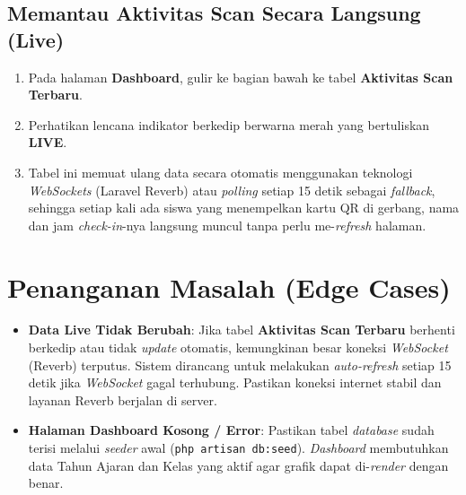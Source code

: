 \subsection{Memantau Aktivitas Scan Secara Langsung (Live)}
\begin{enumerate}
    \item Pada halaman \textbf{Dashboard}, gulir ke bagian bawah ke tabel \textbf{Aktivitas Scan Terbaru}.
    \item Perhatikan lencana indikator berkedip berwarna merah yang bertuliskan \textbf{LIVE}.
    \item Tabel ini memuat ulang data secara otomatis menggunakan teknologi \textit{WebSockets} (Laravel Reverb) atau \textit{polling} setiap 15 detik sebagai \textit{fallback}, sehingga setiap kali ada siswa yang menempelkan kartu QR di gerbang, nama dan jam \textit{check-in}-nya langsung muncul tanpa perlu me-\textit{refresh} halaman.
\end{enumerate}

\section{Penanganan Masalah (Edge Cases)}
\begin{itemize}
    \item \textbf{Data Live Tidak Berubah}: Jika tabel \textbf{Aktivitas Scan Terbaru} berhenti berkedip atau tidak \textit{update} otomatis, kemungkinan besar koneksi \textit{WebSocket} (Reverb) terputus. Sistem dirancang untuk melakukan \textit{auto-refresh} setiap 15 detik jika \textit{WebSocket} gagal terhubung. Pastikan koneksi internet stabil dan layanan Reverb berjalan di server.
    \item \textbf{Halaman Dashboard Kosong / Error}: Pastikan tabel \textit{database} sudah terisi melalui \textit{seeder} awal (\texttt{php artisan db:seed}). \textit{Dashboard} membutuhkan data Tahun Ajaran dan Kelas yang aktif agar grafik dapat di-\textit{render} dengan benar.
\end{itemize}
